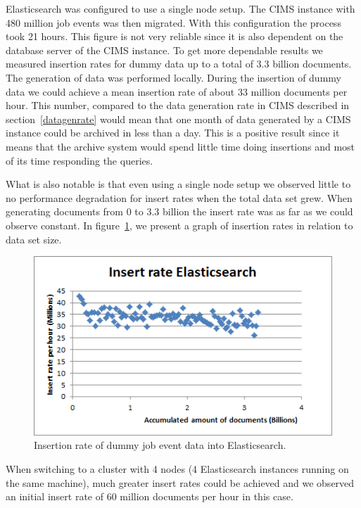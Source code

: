 Elasticsearch was configured to use a single node setup. The CIMS instance with 480 million job events was then migrated. With this configuration the process took 21 hours. This figure is not very reliable since it is also dependent on the database server of the CIMS instance. To get more dependable results we measured insertion rates for dummy data up to a total of 3.3 billion documents. The generation of data was performed locally. During the insertion of dummy data we could achieve a mean insertion rate of about 33 million documents per hour. This number, compared to the data generation rate in CIMS described in section~\ref{datagenrate} would mean that one month of data generated by a CIMS instance could be archived in less than a day. This is a positive result since it means that the archive system would spend little time doing insertions and most of its time responding the queries.

What is also notable is that even using a single node setup we observed little to no performance degradation for insert rates when the total data set grew. When generating documents from 0 to 3.3 billion the insert rate was as far as we could observe constant. In figure~\ref{fig:insert_rate}, we present a graph of insertion rates in relation to data set size.

\begin{figure}[h!]
\centering
\includegraphics[]{figure/insert_rate.png}
\caption{Insertion rate of dummy job event data into Elasticsearch.}
\label{fig:insert_rate}
\end{figure}

When switching to a cluster with 4 nodes (4 Elasticsearch instances running on the same machine), much greater insert rates could be achieved and we observed an initial insert rate of 60 million documents per hour in this case.

